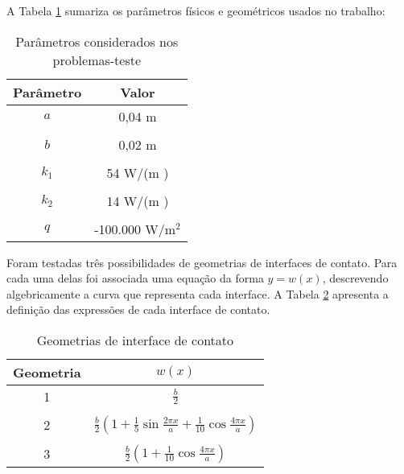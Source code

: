 A Tabela \ref{tabela_params} sumariza os parâmetros físicos e geométricos usados no trabalho:
\begin{table}[h!b]
\begin{center}
	\begin{tabular}{@{}cc@{}}
		\toprule
		\textbf{Parâmetro} & \textbf{Valor}    \\ \midrule
		$a$       & 0,04 m   \\ \\
		$b$       & 0,02 m     \\ \\
		$k_1$     & 54 W/(m \celsius)  \\ \\ 
		$k_2$     & 14 W/(m \celsius) \\ \\
		$q$       & -100.000 W/$\text{m}^2$ \\ \bottomrule
	\end{tabular}		
\end{center}
\caption{Parâmetros considerados nos problemas-teste}
\label{tabela_params}
\end{table}

Foram testadas três possibilidades de geometrias de interfaces de contato. Para cada uma delas foi associada uma equação da forma $y = w(x)$, descrevendo algebricamente a curva que representa cada interface. A Tabela \ref{tabela_interfaces} apresenta a definição das expressões de cada interface de contato.
\begin{table}[h!b]
	\begin{center}
		\begin{tabular}{@{}cc@{}}
			\toprule
			\textbf{Geometria} & $w(x)$    \\ \midrule
			1       & $\displaystyle\frac{b}{2}$   \\ \\
			2     & $\displaystyle\frac{b}{2}\left(1 + \frac{1}{5} \sin\frac{2\pi x}{a} + \frac{1}{10}\cos\frac{4\pi x}{a}\right)$     \\ \\
			3       & $\displaystyle \frac{b}{2}\left(1 + \frac{1}{10} \cos\frac{4 \pi  x}{a}\right)$ \\ \bottomrule
		\end{tabular}		
	\end{center}
	\caption{Geometrias de interface de contato}
	\label{tabela_interfaces}
\end{table}
\newpage

